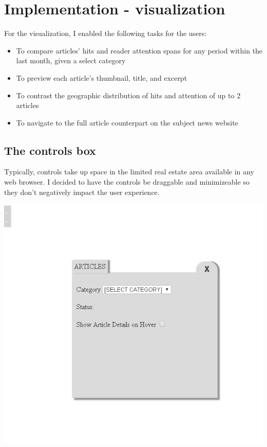 \documentclass[12pt]{article}
\begin{document}
\newpage

\section{Implementation - visualization}

For the visualization, I enabled the following tasks for the users:
\begin{itemize}
\item To compare articles' hits and reader attention spans for any period within the last month, given a select category
\item To preview each article's thumbnail, title, and excerpt
\item To contrast the geographic distribution of hits and attention of up to 2 articles
\item To navigate to the full article counterpart on the subject news website
\end{itemize}

\subsection{The controls box}

Typically, controls take up space in the limited real estate area available in any web browser. I decided to have the controls be draggable and minimizeable so they don't negatively impact the user experience. 

\noindent\includegraphics[scale=0.8]{img/viz_3}
\end{document}
